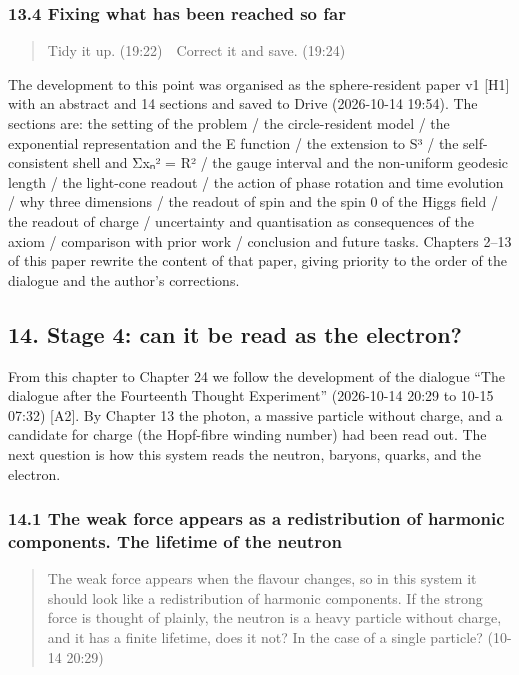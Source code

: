 \documentclass[
  a4paper,
]{article}
\begin{document}
\subsubsection{13.4 Fixing what has been reached so
far}\label{fixing-what-has-been-reached-so-far}

\begin{quote}
Tidy it up. (19:22)　Correct it and save. (19:24)
\end{quote}

The development to this point was organised as the sphere-resident paper
v1 {[}H1{]} with an abstract and 14 sections and saved to Drive
(2026-10-14 19:54). The sections are: the setting of the problem / the
circle-resident model / the exponential representation and the E
function / the extension to S³ / the self-consistent shell and Σxₙ² = R²
/ the gauge interval and the non-uniform geodesic length / the
light-cone readout / the action of phase rotation and time evolution /
why three dimensions / the readout of spin and the spin 0 of the Higgs
field / the readout of charge / uncertainty and quantisation as
consequences of the axiom / comparison with prior work / conclusion and
future tasks. Chapters 2--13 of this paper rewrite the content of that
paper, giving priority to the order of the dialogue and the author's
corrections.

\subsection{14. Stage 4: can it be read as the
electron?}\label{stage-4-can-it-be-read-as-the-electron}

From this chapter to Chapter 24 we follow the development of the
dialogue ``The dialogue after the Fourteenth Thought Experiment''
(2026-10-14 20:29 to 10-15 07:32) {[}A2{]}. By Chapter 13 the photon, a
massive particle without charge, and a candidate for charge (the
Hopf-fibre winding number) had been read out. The next question is how
this system reads the neutron, baryons, quarks, and the electron.

\subsubsection{14.1 The weak force appears as a redistribution of
harmonic components. The lifetime of the
neutron}\label{the-weak-force-appears-as-a-redistribution-of-harmonic-components.-the-lifetime-of-the-neutron}

\begin{quote}
The weak force appears when the flavour changes, so in this system it
should look like a redistribution of harmonic components. If the strong
force is thought of plainly, the neutron is a heavy particle without
charge, and it has a finite lifetime, does it not? In the case of a
single particle? (10-14 20:29)
\end{quote}
\end{document}
